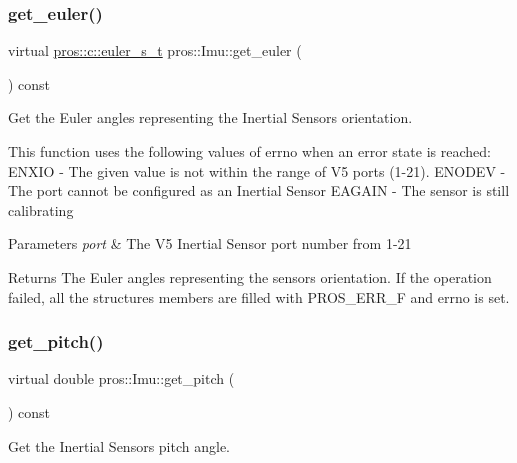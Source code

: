 \subsubsection{\texorpdfstring{get\+\_\+euler()}{get\_euler()}}
{\footnotesize\ttfamily virtual \hyperlink{imu_8h_a93e80020ec907b7e11ac7166e5d01c55}{pros\+::c\+::euler\+\_\+s\+\_\+t} pros\+::\+Imu\+::get\+\_\+euler (\begin{DoxyParamCaption}{ }\end{DoxyParamCaption}) const\hspace{0.3cm}{\ttfamily [virtual]}}



Get the Euler angles representing the Inertial Sensor\textquotesingle{}s orientation. 

This function uses the following values of errno when an error state is reached\+: E\+N\+X\+IO -\/ The given value is not within the range of V5 ports (1-\/21). E\+N\+O\+D\+EV -\/ The port cannot be configured as an Inertial Sensor E\+A\+G\+A\+IN -\/ The sensor is still calibrating


\begin{DoxyParams}{Parameters}
{\em port} & The V5 Inertial Sensor port number from 1-\/21 \\
\hline
\end{DoxyParams}
\begin{DoxyReturn}{Returns}
The Euler angles representing the sensor\textquotesingle{}s orientation. If the operation failed, all the structure\textquotesingle{}s members are filled with P\+R\+O\+S\+\_\+\+E\+R\+R\+\_\+F and errno is set. 
\end{DoxyReturn}
\mbox{\label{classpros_1_1Imu_a9d9e7ad1da6ea8877c48e1b4fadfe8ee}} 
\subsubsection{\texorpdfstring{get\+\_\+pitch()}{get\_pitch()}}
{\footnotesize\ttfamily virtual double pros\+::\+Imu\+::get\+\_\+pitch (\begin{DoxyParamCaption}{ }\end{DoxyParamCaption}) const\hspace{0.3cm}{\ttfamily [virtual]}}



Get the Inertial Sensor\textquotesingle{}s pitch angle. 

